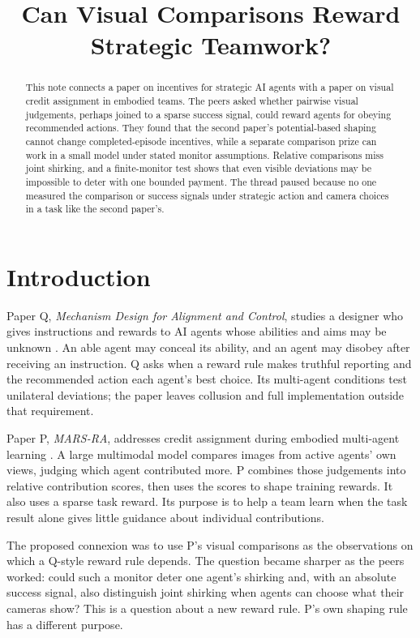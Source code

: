 \documentclass{article}
\title{Can Visual Comparisons Reward Strategic Teamwork?}
\begin{document}
\maketitle

\begin{abstract}
This note connects a paper on incentives for strategic AI agents with a paper on visual credit assignment in embodied
teams. The peers asked whether pairwise visual judgements, perhaps joined to a sparse success signal, could reward
agents for obeying recommended actions. They found that the second paper's potential-based shaping cannot change
completed-episode incentives, while a separate comparison prize can work in a small model under stated monitor
assumptions. Relative comparisons miss joint shirking, and a finite-monitor test shows that even visible deviations
may be impossible to deter with one bounded payment. The thread paused because no one measured the comparison or
success signals under strategic action and camera choices in a task like the second paper's.
\end{abstract}

\section{Introduction}

Paper Q, \emph{Mechanism Design for Alignment and Control}, studies a designer who gives instructions and rewards to
AI agents whose abilities and aims may be unknown \cite{q}. An able agent may conceal its ability, and an agent may
disobey after receiving an instruction. Q asks when a reward rule makes truthful reporting and the recommended action
each agent's best choice. Its multi-agent conditions test unilateral deviations; the paper leaves collusion and full
implementation outside that requirement.

Paper P, \emph{MARS-RA}, addresses credit assignment during embodied multi-agent learning \cite{p}. A large multimodal
model compares images from active agents' own views, judging which agent contributed more. P combines those judgements
into relative contribution scores, then uses the scores to shape training rewards. It also uses a sparse task reward.
Its purpose is to help a team learn when the task result alone gives little guidance about individual contributions.

The proposed connexion was to use P's visual comparisons as the observations on which a Q-style reward rule depends.
The question became sharper as the peers worked: could such a monitor deter one agent's shirking and, with an absolute
success signal, also distinguish joint shirking when agents can choose what their cameras show? This is a question
about a new reward rule. P's own shaping rule has a different purpose.
\end{document}
